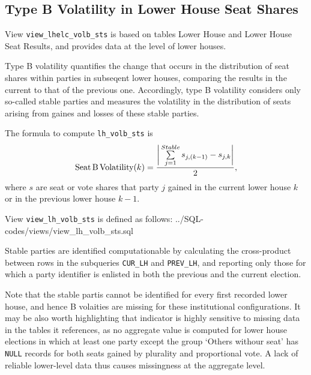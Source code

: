 \subsection{Type B Volatility in Lower House Seat Shares}\label{subsec_view_lh_volb_sts}

View \texttt{view\_lhelc\_volb\_sts} is based on tables Lower House and Lower House Seat Results, and provides data at the level of lower houses.

Type B volatility quantifies the change that occurs in the distribution of seat shares within parties in subseqent lower houses, comparing the results in the current to that of the previous one. 
Accordingly, type B volatility considers only so-called stable parties and measures the  volatility in the distribution of seats arising from gaines and losses of these stable parties.	

The formula to compute \texttt{lh\_volb\_sts} is
\begin{equation}
\mbox{Seat\,B\,Volatility}(k) = \frac{ \bigg| \sum\limits_{j=1}^{Stable} s_{j,(k-1)} - s_{j,k}\bigg| }{2},
\end{equation}
where $s$ are seat or vote shares that party $j$ gained in the current lower house $k$ or in the previous lower house $k-1$.

View \texttt{view\_lh\_volb\_sts} is defined as follows:
%
{../SQL-codes/views/view_lh_volb_sts.sql}

Stable parties are identified computationable by calculating the cross-product between rows in the subqueries 
\texttt{CUR\_LH} and \texttt{PREV\_LH}, and reporting only those for which a party identifier is enlisted in both the previous and the current election.%

Note that the stable partis cannot be identified for every first recorded lower house, and hence B volaities are missing for these institutional configurations.
It may be also worth highlighting that indicator is highly sensitive to missing data in the tables it references, as no aggregate value is computed for lower house elections in which at least one party except the group `Others withour seat' has \texttt{NULL} records for both seats gained by plurality and proportional vote.
A lack of reliable lower-level data thus causes missingness at the aggregate level. 
% 

